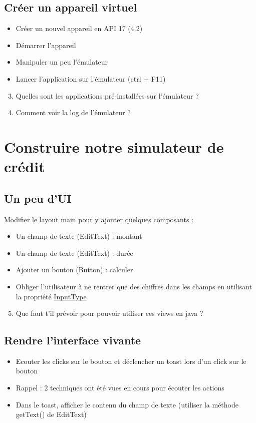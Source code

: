 \documentclass{article}
\begin{document}
\subsection{Créer un appareil virtuel}
\begin{itemize}
\item Créer un nouvel appareil en API 17 (4.2)
\item Démarrer l'appareil
\item Manipuler un peu l'émulateur
\item Lancer l'application sur l'émulateur (ctrl + F11)
\end{itemize}
\begin{enumerate}
 \setcounter{enumi}{2}
\item Quelles sont les applications pré-installées sur l'émulateur ?
\item Comment voir la log de l'émulateur ?
\end{enumerate}
\newpage
\section{Construire notre simulateur de crédit}
\subsection{Un peu d'UI}
Modifier le layout main pour y ajouter quelques composants :
\begin{itemize}
\item Un champ de texte (EditText) : montant
\item Un champ de texte (EditText) : durée
\item Ajouter un bouton (Button) : calculer
\item Obliger l'utilisateur à ne rentrer que des chiffres dans les champs en utilisant la propriété \href{http://developer.android.com/reference/android/widget/TextView.html#attr_android:inputType}{InputType}
\end{itemize}
\begin{enumerate}
 \setcounter{enumi}{4}
\item Que faut t'il prévoir pour pouvoir utiliser ces views en java ?
\end{enumerate}
\subsection{Rendre l'interface vivante}
\begin{itemize}
\item Ecouter les clicks sur le bouton et déclencher un toast lors d'un click sur le bouton
\item Rappel : 2 techniques ont été vues en cours pour écouter les actions
\item Dans le toast, afficher le contenu du champ de texte (utiliser la méthode getText() de EditText)
\end{itemize}
\end{document}
